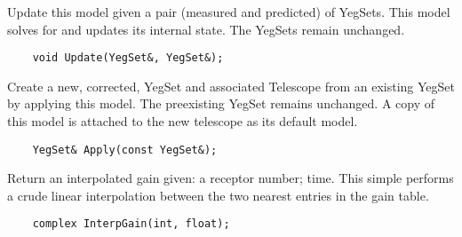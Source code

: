        Update this model given a pair (measured and predicted) of YegSets.
       This model solves for and updates its internal state.  The YegSets
       remain unchanged.
\begin{verbatim}
    void Update(YegSet&, YegSet&);
\end{verbatim}

       Create a new, corrected, YegSet and associated Telescope from an 
       existing YegSet by applying this model.  The preexisting YegSet 
       remains unchanged.  A copy of this model is attached to the
       new telescope as its default model.
\begin{verbatim}
    YegSet& Apply(const YegSet&);
\end{verbatim}
       
        Return an interpolated gain given:
          a receptor number;
          time.
        This simple performs a crude linear interpolation 
        between the two nearest entries in the gain table.
\begin{verbatim}
    complex InterpGain(int, float);
\end{verbatim}
